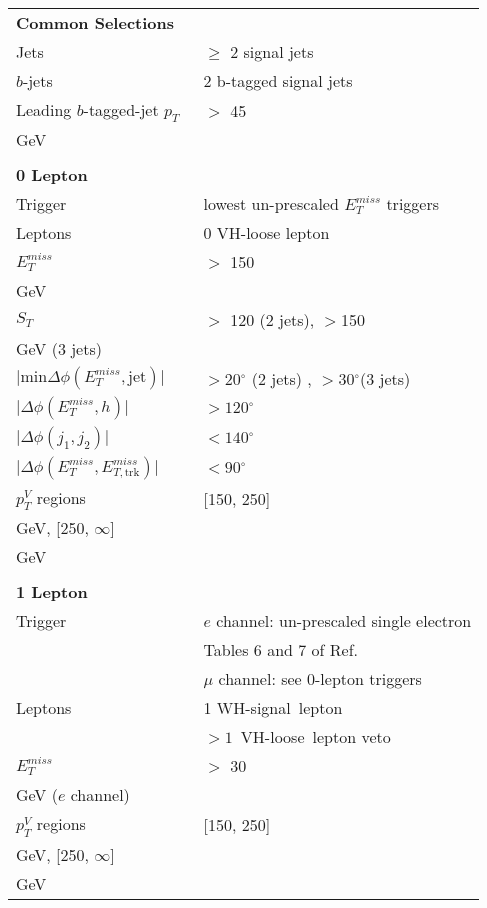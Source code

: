 \begin{table}[ht]
\begin{center}
\begin{tabular}{l l} 

\toprule
\multicolumn{2}{l}{\textbf{Common Selections}}\\

Jets & $\geq$  2 signal jets  \\
$b$-jets &  2 b-tagged signal jets \\
Leading $b$-tagged-jet $p_T$\  & $>$ 45 \\GeV \\

  &\\
\multicolumn{2}{l}{\textbf{0 Lepton}} \\

Trigger & lowest un-prescaled $E_T^{miss}$ triggers \\
Leptons & 0 VH-loose lepton \\
$E_T^{miss}$ & $>$ 150~\\GeV  \\

$S_T$ & $>$ 120 (2 jets), $>$150 \\GeV (3 jets)  \\
$\lvert \text{min} \Delta \phi (E_T^{miss}, \text{jet}) \rvert$ & $> 20\ensuremath{^\circ}$ (2 jets) , $> 30\ensuremath{^\circ}$(3 jets) \\
  $\lvert \Delta\phi(E_T^{miss}, h) \rvert$ & $> 120\ensuremath{^\circ}$ \\
$\lvert \Delta\phi(j_1, j_2) \rvert$ & $< 140\ensuremath{^\circ}$ \\
$\lvert \Delta\phi(E_T^{miss}, E_{T, \text{trk}}^{miss}) \rvert$ & $< 90\ensuremath{^\circ}$ \\
$p_T^V$ regions & [150, 250]~\\GeV, [250, $\infty$]~\\GeV  \\

&\\

\multicolumn{2}{l}{\textbf{1 Lepton}} \\

Trigger &  $e$ channel: un-prescaled single electron \\
        & Tables 6 and 7 of Ref.~\cite{VHobjectsupportnote}\\
	    & $\mu$ channel: see 0-lepton triggers \\
Leptons & 1 WH-signal\ lepton \\
        &  $>1$~VH-loose\ lepton veto \\
$E_T^{miss}$   & $>$ 30~\\GeV ($e$ channel) \\
$p_T^{V}$ regions & [150, 250]~\\GeV, [250, $\infty$]~\\GeV  \\ 


\end{tabular}
\end{center}
\end{table}

